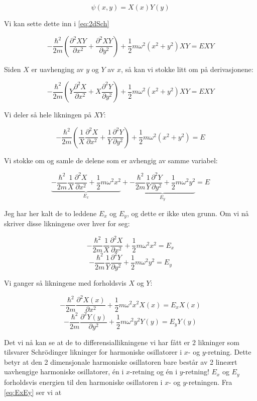 \documentclass[a4paper,norsk, 10pt]{article}
\numberwithin{equation}{section}
\begin{document}
$$
\psi(x,y) = X(x)Y(y)
$$

Vi kan sette dette inn i \ref{eq:2dSch}

$$
-\frac{\hbar^2}{2m}\left(\frac{\partial^2 XY}{\partial x^2} + \frac{\partial^2 XY}{\partial y^2}\right) + \frac{1}{2}m\omega^2(x^2 + y^2)XY = EXY
$$


Siden $X$ er uavhenging av $y$ og $Y$ av $x$, så kan vi stokke litt om på derivasjonene:

$$
-\frac{\hbar^2}{2m}\left(Y\frac{\partial^2 X}{\partial x^2} + X\frac{\partial^2 Y}{\partial y^2}\right) + \frac{1}{2}m\omega^2(x^2 + y^2)XY = EXY
$$

Vi deler så hele likningen på $XY$:

$$
-\frac{\hbar^2}{2m}\left(\frac{1}{X}\frac{\partial^2 X}{\partial x^2} + \frac{1}{Y}\frac{\partial^2 Y}{\partial y^2}\right) + \frac{1}{2}m\omega^2(x^2 + y^2) = E
$$

Vi stokke om og samle de delene som er avhengig av samme variabel:

\begin{equation}
\underbrace{-\frac{\hbar^2}{2m}\frac{1}{X}\frac{\partial^2 X}{\partial x^2} + \frac{1}{2}m\omega^2x^2}_{E_x} + \underbrace{-\frac{\hbar^2}{2m}\frac{1}{Y}\frac{\partial^2 Y}{\partial y^2} + \frac{1}{2}m\omega^2y^2}_{E_y} = E
\label{eq:ExEy}
\end{equation}


Jeg har her kalt de to leddene $E_x$ og $E_y$, og dette er ikke uten grunn. Om vi nå skriver disse likningene over hver for seg:

$$
-\frac{\hbar^2}{2m}\frac{1}{X}\frac{\partial^2 X}{\partial x^2} + \frac{1}{2}m\omega^2x^2 = E_x
$$
$$
-\frac{\hbar^2}{2m}\frac{1}{Y}\frac{\partial^2 Y}{\partial y^2} + \frac{1}{2}m\omega^2y^2 = E_y
$$

Vi ganger så likningene med forholdsvis $X$ og $Y$:

$$
-\frac{\hbar^2}{2m}\frac{\partial^2 X(x)}{\partial x^2} + \frac{1}{2}m\omega^2x^2X(x) = E_xX(x)
$$
$$
-\frac{\hbar^2}{2m}\frac{\partial^2 Y(y)}{\partial y^2} + \frac{1}{2}m\omega^2y^2Y(y) = E_yY(y)
$$

Det vi nå kan se at de to differensiallikningene vi har fått er 2 likninger som tilsvarer Schrödinger likninger for harmoniske osillatorer i $x$- og $y$-retning. Dette betyr at den 2 dimensjonale harmoniske osillatoren bare består av 2 lineært uavhengige harmoniske osillatorer, én i $x$-retning og én i $y$-retning! $E_x$ og $E_y$ forholdsvis energien til den harmoniske osillatoren i $x$- og $y$-retningen. Fra \ref{eq:ExEy} ser vi at
\end{document}
